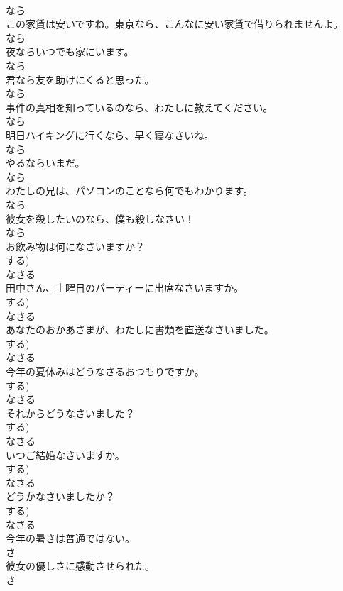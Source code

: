 \documentclass[8pt]{extreport}
\begin{document}
\begin{CJK}{UTF8}{min}
\\	なら	
\\	この家賃は安いですね。東京なら、こんなに安い家賃で借りられませんよ。	
\\	なら	
\\	夜ならいつでも家にいます。	
\\	なら	
\\	君なら友を助けにくると思った。	
\\	なら	
\\	事件の真相を知っているのなら、わたしに教えてください。	
\\	なら	
\\	明日ハイキングに行くなら、早く寝なさいね。	
\\	なら	
\\	やるならいまだ。	
\\	なら	
\\	わたしの兄は、パソコンのことなら何でもわかります。	
\\	なら	
\\	彼女を殺したいのなら、僕も殺しなさい！	
\\	なら	
\\	お飲み物は何になさいますか？	
\\	する)	
\\	なさる	
\\	田中さん、土曜日のパーティーに出席なさいますか。	
\\	する)	
\\	なさる	
\\	あなたのおかあさまが、わたしに書類を直送なさいました。	
\\	する)	
\\	なさる	
\\	今年の夏休みはどうなさるおつもりですか。	
\\	する)	
\\	なさる	
\\	それからどうなさいました？	
\\	する)	
\\	なさる	
\\	いつご結婚なさいますか。	
\\	する)	
\\	なさる	
\\	どうかなさいましたか？	
\\	する)	
\\	なさる	
\\	今年の暑さは普通ではない。	
\\	さ	
\\	彼女の優しさに感動させられた。	
\\	さ	

\end{CJK}
\end{document}
